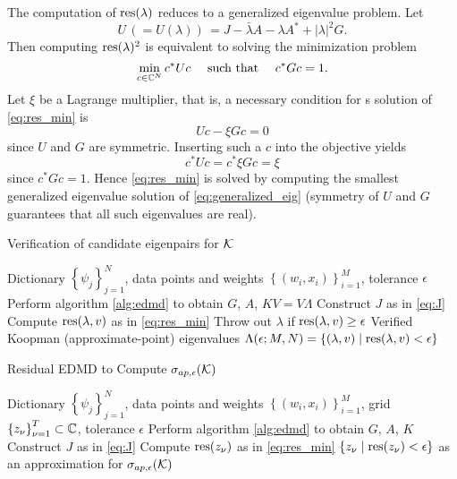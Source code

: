 The computation of $\text{res} (\lambda)$ reduces to a generalized eigenvalue problem. Let 
\begin{equation}
    U \,( = U(\lambda) )\, = J - \bar{\lambda} A - \lambda A^* + | \lambda |^2 G . 
\end{equation}
Then computing $\text{res} (\lambda)^2$ is equivalent to solving the minimization problem 
\begin{equation}
    \label{eq:res_min}
    \min_{c \in \mathbb{C}^N} c^* U c \quad \text{ such that } \quad c^* G c = 1 .  
\end{equation}
Let $\xi$ be a Lagrange multiplier, that is, a necessary condition for s solution of 
\ref{eq:res_min} is 
\begin{equation}
    \label{eq:generalized_eig}
    U c - \xi G c = 0 
\end{equation}
since $U$ and $G$ are symmetric. Inserting such a $c$ into the objective yields 
\begin{equation}
    c^* U c = c^* \xi G c = \xi
\end{equation}
since $c^* G c = 1$. Hence \ref{eq:res_min} is solved by computing the smallest 
generalized eigenvalue solution of \ref{eq:generalized_eig} (symmetry of $U$ and $G$ 
guarantees that all such eigenvalues are real). 

\begin{algorithm}
    \caption{Verification of candidate eigenpairs for $\mathcal{K}$}
    \label{alg:edmd_verified_residual}
    \begin{algorithmic}[1]
        \Require Dictionary $\left\{ \psi_j \right\}_{j=1}^N$, 
            data points and weights $\left\{ (w_i, x_i) \right\}_{i=1}^M$, 
            tolerance $\epsilon$
        \State Perform algorithm \ref{alg:edmd} to obtain $G$, $A$, $K V = V \Lambda$
        \State Construct $J$ as in \ref{eq:J}
            \State Compute $\text{res} (\lambda, v)$ as in \ref{eq:res_min}
            \State Throw out $\lambda$ if $\text{res} (\lambda, v) \geq \epsilon$
        \EndFor
        \State \Return Verified Koopman (approximate-point) eigenvalues 
        $\Lambda (\epsilon; M, N) = \left\{ (\lambda, v) \mid \text{res} (\lambda, v) < \epsilon \right\}$
    \end{algorithmic}
\end{algorithm}

\begin{algorithm}
    \caption{Residual EDMD to Compute $\sigma_{ap, \epsilon} (\mathcal{K})$}
    \label{alg:resdmd}
    \begin{algorithmic}[1]
        \Require Dictionary $\left\{ \psi_j \right\}_{j=1}^N$, 
            data points and weights $\left\{ (w_i, x_i) \right\}_{i=1}^M$, 
            grid $\left\{ z_\nu \right\}_{\nu=1}^T \subset \mathbb{C}$,
            tolerance $\epsilon$
        \State Perform algorithm \ref{alg:edmd} to obtain $G$, $A$, $K$
        \State Construct $J$ as in \ref{eq:J}
            \State Compute $\text{res} (z_\nu)$ as in \ref{eq:res_min}
        \EndFor
        \State \Return $\left\{ z_\nu \mid \text{res} (z_\nu) < \epsilon \right\}$
            as an approximation for $\sigma_{ap, \epsilon} (\mathcal{K})$
    \end{algorithmic}
\end{algorithm}

